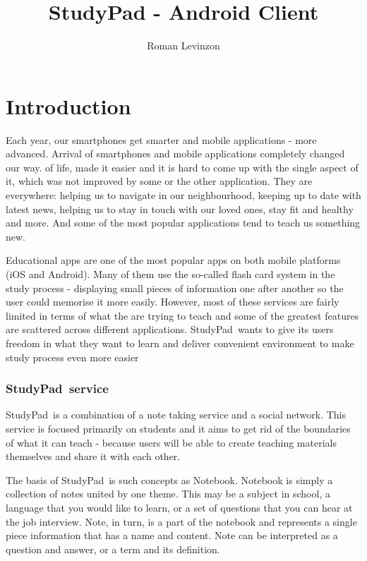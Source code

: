 \documentclass[thesis=B,english]{FITthesis}[2012/10/20]
\title{StudyPad - Android Client}
\author{Roman Levinzon} %
\newcommand{\appname}{StudyPad}
\begin{document}

\chapter{Introduction}

Each year, our smartphones get smarter and mobile applications - more advanced. Arrival of smartphones and mobile applications completely changed our way. of life, made it easier and it is hard to come up with the single aspect of it, which was not improved by some or the other application. They are everywhere: helping us to navigate in our neighbourhood, keeping up to date with latest news, helping us to stay in touch with our loved ones, stay  fit and healthy and more. And some of the most popular applications tend to teach us something new.	

Educational apps are one of the most popular apps on both mobile platforms (iOS and Android). Many of them use the so-called flash card system in the study process - displaying small pieces of information one after another so the user could memorise it more easily. However, most of these services are fairly limited in terms of what the are trying to teach and some of the greatest  features are scattered across different applications. \appname\ wants to give its users freedom in what they want to learn and deliver convenient environment to make study process even more easier

\subsection{\appname\ service}
\appname\ is a combination of a note taking service and a social network. This service is focused primarily on students and it aims to get rid of the boundaries of what it can teach - because users will be able to create teaching materials themselves and share it with each other.

The basis of \appname\ is such concepts as Notebook. Notebook is simply a collection of notes united by one theme. This may be a subject in school, a language that you would like to learn, or a set of questions that you can hear at the job interview. Note, in turn, is a part of the notebook and represents a single piece information that has a name and content. Note can be interpreted as a question and answer, or a term and its definition.
\end{document}
